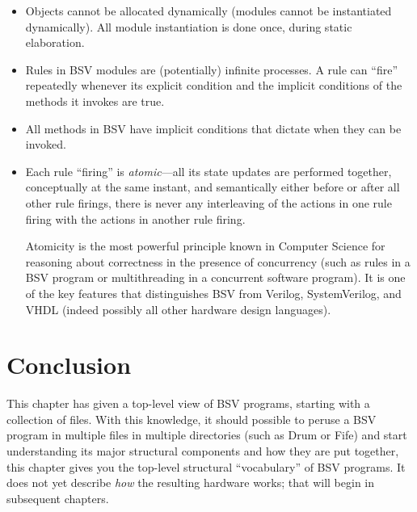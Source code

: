 \begin{itemize}

 \item Objects cannot be allocated dynamically (modules cannot be
       instantiated dynamically).  All module instantiation is done
       once, during static elaboration.

 \item Rules in BSV modules are (potentially) infinite processes.  A
       rule can ``fire'' repeatedly whenever its explicit condition
       and the implicit conditions of the methods it invokes are true.

 \item All methods in BSV have implicit conditions that dictate when
       they can be invoked.

 \item Each rule ``firing'' is \emph{atomic}---all its state updates
       are performed together, conceptually at the same instant, and
       semantically either before or after all other rule firings,
       {\ie} there is never any interleaving of the actions in one
       rule firing with the actions in another rule firing.

       Atomicity is the most powerful principle known in Computer
       Science for reasoning about correctness in the presence of
       concurrency (such as rules in a BSV program or multithreading
       in a concurrent software program).  It is one of the key
       features that distinguishes BSV from Verilog, SystemVerilog,
       and VHDL (indeed possibly all other hardware design languages).

\end{itemize}


\section{Conclusion}

This chapter has given a top-level view of BSV programs, starting with
a collection of files.  With this knowledge, it should possible to
peruse a BSV program in multiple files in multiple directories (such
as Drum or Fife) and start understanding its major structural
components and how they are put together, {\ie} this chapter gives you
the top-level structural ``vocabulary'' of BSV programs.  It does not
yet describe \emph{how} the resulting hardware works; that will begin
in subsequent chapters.

